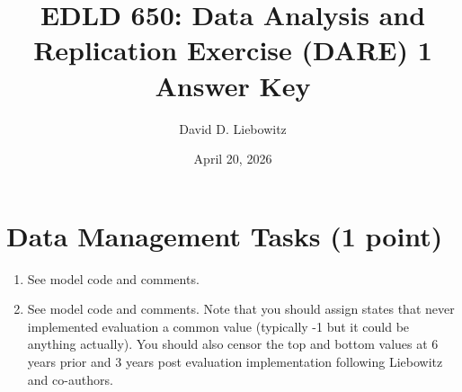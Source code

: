 \documentclass[a4paper, 11pt]{article}
\title{EDLD 650: Data Analysis and Replication Exercise (DARE) 1
Answer Key}
\author{David D. Liebowitz}
\date{April 20, 2026}
\begin{document}
\maketitle

\section{Data Management Tasks (1 point)}
\begin{enumerate}
	\item[A1.] See model code and comments.
	\item[A2.] See model code and comments. Note that you should assign states that never implemented evaluation a common value (typically -1 but it could be anything actually). You should also censor the top and bottom values at 6 years prior and 3 years post evaluation implementation following Liebowitz and co-authors.
\end{enumerate}
\end{document}
